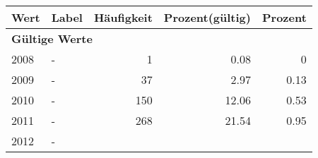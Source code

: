      \begin{longtable}{lXrrr}
     \toprule
     \textbf{Wert} & \textbf{Label} & \textbf{Häufigkeit} & \textbf{Prozent(gültig)} & \textbf{Prozent} \\
     \endhead
     \midrule
     \multicolumn{5}{l}{\textbf{Gültige Werte}}\\

     2008 &
     \multicolumn{1}{X}{ -  } &


       \num{1} &
       \num[round-mode=places,round-precision=2]{0,08} &
         \num[round-mode=places,round-precision=2]{0} \\

     2009 &
     \multicolumn{1}{X}{ -  } &


       \num{37} &
       \num[round-mode=places,round-precision=2]{2,97} &
         \num[round-mode=places,round-precision=2]{0,13} \\

     2010 &
     \multicolumn{1}{X}{ -  } &


       \num{150} &
       \num[round-mode=places,round-precision=2]{12,06} &
         \num[round-mode=places,round-precision=2]{0,53} \\

     2011 &
     \multicolumn{1}{X}{ -  } &


       \num{268} &
       \num[round-mode=places,round-precision=2]{21,54} &
         \num[round-mode=places,round-precision=2]{0,95} \\

     2012 &
     \multicolumn{1}{X}{ -  } &



\end{longtable}

